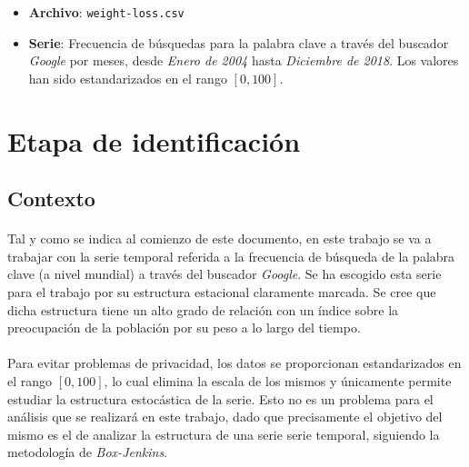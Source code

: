 \documentclass[a4paper, spanish]{article}
\begin{document}
  \maketitle

  \begin{itemize}
    \item \textbf{Archivo}: \texttt{weight-loss.csv}
    \item \textbf{Serie}: Frecuencia de búsquedas para la palabra clave  a través del buscador \emph{Google} por meses, desde \emph{Enero de 2004} hasta \emph{Diciembre de 2018}. Los valores han sido estandarizados en el rango $[0, 100]$.
  \end{itemize}

  \section{Etapa de identificación}
  \label{sec:1}

    \subsection{Contexto}
    \label{sec:context}

      \paragraph{}
      Tal y como se indica al comienzo de este documento, en este trabajo se va a trabajar con la serie temporal referida a la frecuencia de búsqueda de la palabra clave  (a nivel mundial) a través del buscador \emph{Google}. Se ha escogido esta serie para el trabajo por su estructura estacional claramente marcada. Se cree que dicha estructura tiene un alto grado de relación con un índice sobre la preocupación de la población por su peso a lo largo del tiempo.

      \paragraph{}
      Para evitar problemas de privacidad, los datos se proporcionan estandarizados en el rango $[0, 100]$, lo cual elimina la escala de los mismos y únicamente permite estudiar la estructura estocástica de la serie. Esto no es un problema para el análisis que se realizará en este trabajo, dado que precisamente el objetivo del mismo es el de analizar la estructura de una serie serie temporal, siguiendo la metodología de \emph{Box-Jenkins}.
\end{document}
